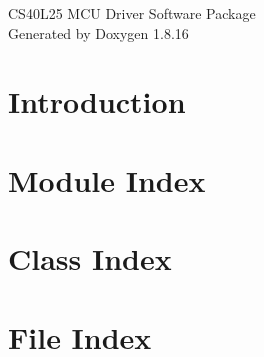 \let\mypdfximage\pdfximage\def\pdfximage{\immediate\mypdfximage}\documentclass[twoside]{book}
\newcommand{\+}{\discretionary{\mbox{\scriptsize$\hookleftarrow$}}{}{}}
\newcommand{\clearemptydoublepage}{%
  \newpage{\pagestyle{empty}\cleardoublepage}%
}
\begin{document}
\hypersetup{pageanchor=false,
             bookmarksnumbered=true,
             pdfencoding=unicode
            }
\begin{titlepage}
\vspace*{7cm}
\begin{center}%
{\Large C\+S40\+L25 M\+CU Driver Software Package }\\
\vspace*{1cm}
{\large Generated by Doxygen 1.8.16}\\
\end{center}
\end{titlepage}
\clearemptydoublepage
{}
\tableofcontents
\clearemptydoublepage
{}
\hypersetup{pageanchor=true}

\chapter{Introduction}
\label{index}\hypertarget{index}{}
\chapter{Module Index}

\chapter{Class Index}

\chapter{File Index}

\end{document}
